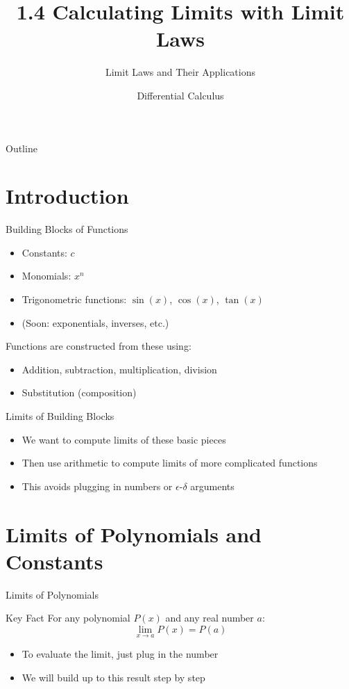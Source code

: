 \documentclass[aspectratio=169]{beamer}
\title{1.4 Calculating Limits with Limit Laws}
\subtitle{Limit Laws and Their Applications}
\author{Differential Calculus}
\date{}
\newcommand{\limx}[2]{\lim_{x \to #1} #2}
\begin{document}
\begin{frame}
\titlepage
\end{frame}

\begin{frame}{Outline}
\tableofcontents
\end{frame}

\section{Introduction}

\begin{frame}{Building Blocks of Functions}
\begin{itemize}
  \item Constants: $c$
  \item Monomials: $x^n$
  \item Trigonometric functions: $\sin(x)$, $\cos(x)$, $\tan(x)$
  \item (Soon: exponentials, inverses, etc.)
\end{itemize}
\vspace{1em}
Functions are constructed from these using:
\begin{itemize}
  \item Addition, subtraction, multiplication, division
  \item Substitution (composition)
\end{itemize}
\end{frame}

\begin{frame}{Limits of Building Blocks}
\begin{itemize}
  \item We want to compute limits of these basic pieces
  \item Then use arithmetic to compute limits of more complicated functions
  \item This avoids plugging in numbers or $\epsilon$-$\delta$ arguments
\end{itemize}
\end{frame}

\section{Limits of Polynomials and Constants}

\begin{frame}{Limits of Polynomials}
\begin{block}{Key Fact}
For any polynomial $P(x)$ and any real number $a$:
$$\limx{a}{P(x)} = P(a)$$
\end{block}
\begin{itemize}
  \item To evaluate the limit, just plug in the number
  \item We will build up to this result step by step
\end{itemize}
\end{frame}
\end{document}
